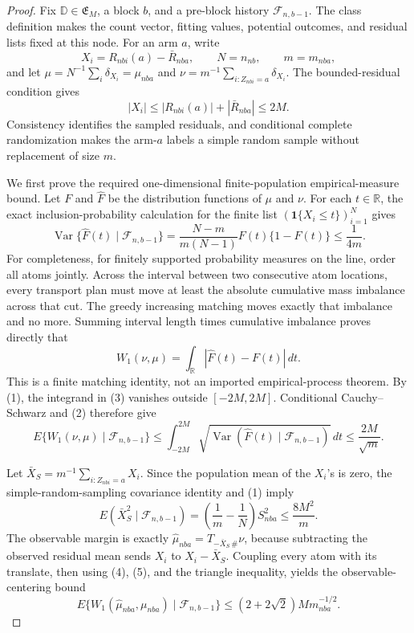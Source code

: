 \documentclass{article}
\begin{document}
\begin{proof}
Fix \(\mathbb D\in\mathfrak E_M\), a block \(b\), and a pre-block history \(\mathcal F_{n,b-1}\). The class definition makes the count vector, fitting values, potential outcomes, and residual lists fixed at this node. For an arm \(a\), write
\[
X_i=R_{nbi}(a)-\bar R_{nba},\qquad N=n_{nb},\qquad m=m_{nba},
\]
and let \(\mu=N^{-1}\sum_i\delta_{X_i}=\mu_{nba}\) and
\(\nu=m^{-1}\sum_{i:Z_{nbi}=a}\delta_{X_i}\). The bounded-residual condition gives
\[
|X_i|\le |R_{nbi}(a)|+|\bar R_{nba}|\le2M.
\tag{1}
\]
Consistency identifies the sampled residuals, and conditional complete randomization makes the arm-\(a\) labels a simple random sample without replacement of size \(m\).

We first prove the required one-dimensional finite-population empirical-measure bound. Let \(F\) and \(\widehat F\) be the distribution functions of \(\mu\) and \(\nu\). For each \(t\in\mathbb R\), the exact inclusion-probability calculation for the finite list \((\mathbf1\{X_i\le t\})_{i=1}^N\) gives
\[
\operatorname{Var}\{\widehat F(t)\mid\mathcal F_{n,b-1}\}
=\frac{N-m}{m(N-1)}F(t)\{1-F(t)\}\le\frac1{4m}.
\tag{2}
\]
For completeness, for finitely supported probability measures on the line, order all atoms jointly. Across the interval between two consecutive atom locations, every transport plan must move at least the absolute cumulative mass imbalance across that cut. The greedy increasing matching moves exactly that imbalance and no more. Summing interval length times cumulative imbalance proves directly that
\[
W_1(\nu,\mu)=\int_{\mathbb R}|\widehat F(t)-F(t)|\,dt.
\tag{3}
\]
This is a finite matching identity, not an imported empirical-process theorem. By (1), the integrand in (3) vanishes outside \([-2M,2M]\). Conditional Cauchy--Schwarz and (2) therefore give
\[
E\{W_1(\nu,\mu)\mid\mathcal F_{n,b-1}\}
\le\int_{-2M}^{2M}\sqrt{\operatorname{Var}(\widehat F(t)\mid\mathcal F_{n,b-1})}\,dt
\le\frac{2M}{\sqrt m}.
\tag{4}
\]

Let \(\bar X_S=m^{-1}\sum_{i:Z_{nbi}=a}X_i\). Since the population mean of the \(X_i\)'s is zero, the simple-random-sampling covariance identity and (1) imply
\[
E(\bar X_S^2\mid\mathcal F_{n,b-1})
=\left(\frac1m-\frac1N\right)S_{nba}^2
\le\frac{8M^2}{m}.
\tag{5}
\]
The observable margin is exactly
\(\widehat\mu_{nba}=T_{-\bar X_S\,\#}\nu\), because subtracting the observed residual mean sends \(X_i\) to \(X_i-\bar X_S\). Coupling every atom with its translate, then using (4), (5), and the triangle inequality, yields the observable-centering bound
\[
E\{W_1(\widehat\mu_{nba},\mu_{nba})\mid\mathcal F_{n,b-1}\}
\le (2+2\sqrt2)M m_{nba}^{-1/2}.
\tag{6}
\]


\end{proof}
\end{document}
